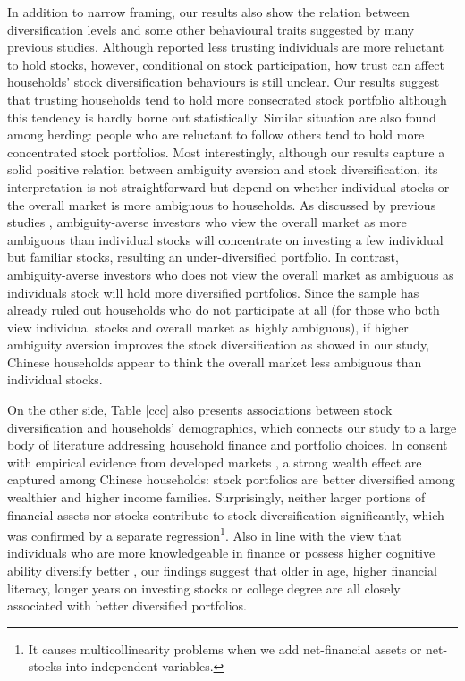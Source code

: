 \documentclass[ukenglish,nottitlepage,thmsb,11pt,letterpaper]{article}
\begin{document}
In addition to narrow framing, our results also show the relation between diversification levels and some other behavioural traits suggested by many previous studies. Although \citet{Guiso2008} reported less trusting individuals are more reluctant to hold stocks, however, conditional on stock participation, how trust can affect households' stock diversification behaviours is still unclear. Our results suggest that trusting households tend to hold more consecrated stock portfolio  although this tendency is hardly borne out statistically. Similar situation are also found among herding: people who are reluctant to follow others tend to hold more concentrated stock portfolios.  Most interestingly, although our results capture a solid positive relation between ambiguity aversion and stock diversification, its interpretation is not straightforward but depend on whether individual stocks or the overall market is more ambiguous to households. As discussed by previous studies \citep[e.g., ][]{Boyle2012,Dimmock2016},  ambiguity-averse investors who view the overall market as more ambiguous than individual stocks will concentrate on investing a few individual but familiar stocks, resulting an under-diversified portfolio. In contrast,  ambiguity-averse investors who does not view the overall market as ambiguous as individuals stock will hold more diversified portfolios. Since the sample has already ruled out households who do not participate at all (for those who both view individual stocks and overall market as highly ambiguous), if higher ambiguity aversion improves the stock diversification as showed in our study, Chinese households appear to think the overall market less ambiguous than individual stocks. 

On the other side, Table \ref{ccc}  also presents associations between stock diversification and households' demographics, which connects our study to a large body of literature addressing household finance and portfolio choices. In consent with empirical evidence from developed markets \citep[e.g., ][]{Vissing-Jorgensen2002,Vissing-Jorgensen2003,Campbell2006,Goetzmann2008,Fuertes2014}, a strong wealth effect are captured among Chinese households: stock portfolios are better diversified among wealthier and higher income families. Surprisingly, neither larger portions of financial assets nor stocks  contribute to stock diversification significantly, which was confirmed by a separate regression\footnote{It causes multicollinearity problems when we add net-financial assets or net-stocks into independent variables. }.  Also in line with the view that individuals who are more knowledgeable in finance or possess higher cognitive ability diversify better \citep[e.g., see][]{Dorn2009,Fuertes2014,Gaudecker2015}, our findings suggest that older in age, higher financial literacy, longer years on investing stocks or college degree are all closely associated with better diversified portfolios.
\end{document}
